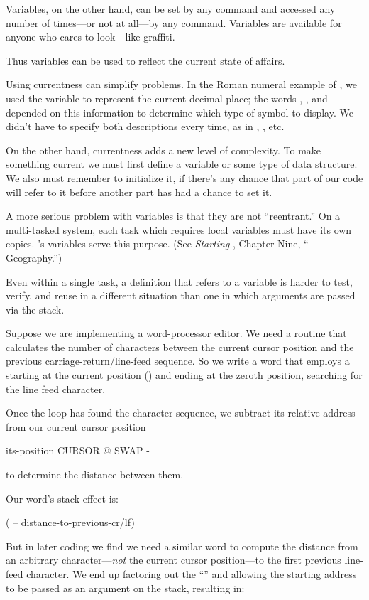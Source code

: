 Variables, on the other hand, can be set by any command and accessed
any number of times---or not at all---by any command. Variables
are available for anyone who cares to look---like graffiti.

Thus variables can be used to reflect the current state of affairs.

Using currentness can simplify problems. In the Roman numeral example
of , we used the variable  to represent the
current decimal-place; the words , , and
 depended on this information to determine which type of
symbol to display. We didn't have to specify both descriptions every
time, as in , , etc.

On the other hand, currentness adds a new level of complexity. To make
something current we must first define a variable or some type of data
structure. We also must remember to initialize it, if there's any chance
that part of our code will refer to it before another part has had a
chance to set it.

A more serious problem with variables is that they are not ``reentrant.''
On a multi-tasked \Forth{} system, each task which requires local
variables must have its own copies. \Forth{}'s  variables
serve this purpose. (See \emph{Starting \Forth{}}, Chapter Nine,
``\Forth{} Geography.'')

Even within a single task, a definition that refers to a variable is
harder to test, verify, and reuse in a different situation than one in
which arguments are passed via the stack.

Suppose we are implementing a word-processor editor. We need a routine
that calculates the number of characters between the current cursor
position and the previous carriage-return/line-feed sequence. So we write
a word that employs a  starting at the current
position () and ending at the zeroth position, searching
for the line feed character.

Once the loop has found the character sequence, we subtract its
relative address from our current cursor position

\begin{Code}
its-position CURSOR @  SWAP -
\end{Code}
to determine the distance between them.

Our word's stack effect is:

\begin{Code}
( -- distance-to-previous-cr/lf)
\end{Code}
But in later coding we find we need a similar word to compute the distance
from an arbitrary character---\emph{not} the current cursor position---to
the first previous line-feed character. We end up factoring out the
``'' and allowing the starting address to be passed as an
argument on the stack, resulting in:

